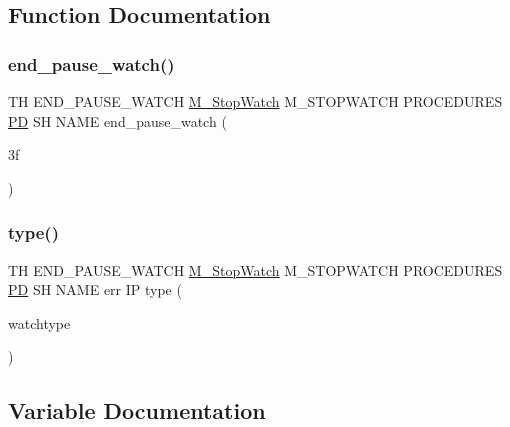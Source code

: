\subsection{Function Documentation}
\mbox{\label{end__pause__watch_83_8txt_aab2e2d273c44ad682568533e5099a62f}} 
\subsubsection{\texorpdfstring{end\+\_\+pause\+\_\+watch()}{end\_pause\_watch()}}
{\footnotesize\ttfamily TH E\+N\+D\+\_\+\+P\+A\+U\+S\+E\+\_\+\+W\+A\+T\+CH \hyperlink{option__stopwatch_83_8txt_aa2011fc45a5e502e87ee50996a8a9305}{M\+\_\+\+Stop\+Watch} M\+\_\+\+S\+T\+O\+P\+W\+A\+T\+CH P\+R\+O\+C\+E\+D\+U\+R\+ES \hyperlink{what__overview_81_8txt_a85f26da5a4481fbdb0d9c79f2b94de3e}{PD} SH N\+A\+ME end\+\_\+pause\+\_\+watch (\begin{DoxyParamCaption}\item[{3f}]{ }\end{DoxyParamCaption})}

\mbox{\label{end__pause__watch_83_8txt_a4519ce363764fb1188bbf48b67a49759}} 
\subsubsection{\texorpdfstring{type()}{type()}}
{\footnotesize\ttfamily TH E\+N\+D\+\_\+\+P\+A\+U\+S\+E\+\_\+\+W\+A\+T\+CH \hyperlink{option__stopwatch_83_8txt_aa2011fc45a5e502e87ee50996a8a9305}{M\+\_\+\+Stop\+Watch} M\+\_\+\+S\+T\+O\+P\+W\+A\+T\+CH P\+R\+O\+C\+E\+D\+U\+R\+ES \hyperlink{what__overview_81_8txt_a85f26da5a4481fbdb0d9c79f2b94de3e}{PD} SH N\+A\+ME err IP type (\begin{DoxyParamCaption}\item[{watchtype}]{ }\end{DoxyParamCaption})}



\subsection{Variable Documentation}
\mbox{\label{end__pause__watch_83_8txt_a872617f37ec8987521e3b8eb64ee451b}} 
